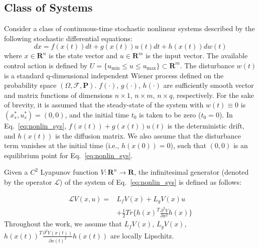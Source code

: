 \documentclass[letterpaper, 10pt, conference]{ieeeconf}
\begin{document}
	\subsection{Class of Systems}
	Consider a class of continuous-time stochastic nonlinear systems described by the following stochastic differential equations:
	\begin{equation}
	\label{eq:nonlin_sys}
	d{x} = f(x(t))dt+g(x(t))u(t)dt +h(x(t))dw(t)
	\end{equation}
	where $x \in \mathbf{R}^n$ is the state vector and $u \in \mathbf{R}^m$ is the input vector. The available control action is defined by $U = \{u_{\min} \leq u \leq u_{\max}\} \subset \mathbf{R}^m$. The disturbance $w(t)$ is a standard q-dimensional independent Wiener process defined on the probability space $(\Omega, \mathcal{F}, \mathbf{P})$. $f(\cdot)$, $g(\cdot)$, $h(\cdot)$ are sufficiently smooth vector and matrix functions of dimensions $n \times 1$, $n \times m$, $n \times q$, respectively. For the sake of brevity, it is assumed that the steady-state of the system with $w(t) \equiv 0$ is $(x_s^*, u_s^*)=(0,0)$, and the initial time $t_0$ is taken to be zero ($t_0 = 0$). In Eq.~\ref{eq:nonlin_sys}, $f(x(t))+g(x(t))u(t)$ is the deterministic drift, and $h(x(t))$ is the diffusion matrix. We also assume that the disturbance term vanishes at the initial time (i.e., $h(x(0))=0$), such that $(0, 0)$ is an equilibrium point for Eq.~\ref{eq:nonlin_sys}.
	
	\begin{definition}
		Given a $C^2$ Lyapunov function $V : \mathbf{R}^n \rightarrow \mathbf{R}$, the infinitesimal generator (denoted by the operator $\mathcal{L}$) of the system of Eq.~\ref{eq:nonlin_sys} is defined as follows:
	\end{definition}
	\begin{equation}\label{eq:generator}
	\begin{split}
	\mathcal{L}V(x,u)=&L_fV(x)+L_gV(x)u\\
	&+\frac{1}{2} Tr\{h(x)^T\frac{\partial^2 V}{\partial x^2}h(x)\}
	\end{split}
	\end{equation}
Throughout the work, we assume that $L_fV(x)$, $L_gV(x)$, $h(x(t))^T \frac{\partial^2V(x(t))}{\partial x(t)^2}h(x(t))$ are locally Lipschitz.

\vspace{0.3cm}
\end{document}
